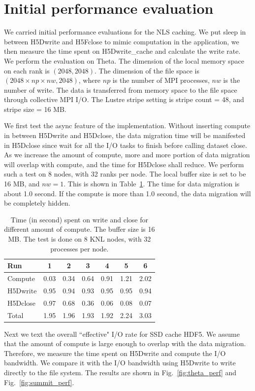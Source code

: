 \documentclass[aps, prb, 11pt, notitlepage]{revtex4-1}
\begin{document}
\section{Initial performance evaluation}
\label{sec:benchmarks}
We carried initial performance evaluations for the NLS caching. We put sleep in between H5Dwrite and H5Fclose to mimic computation in the application, we then measure the time spent on H5Dwrite\_cache and calculate the write rate. We perform the evaluation on Theta. The dimension of the local memory space on each rank is $(2048, 2048)$. The dimension of the file space is $(2048\times np\times nw, 2048)$, where $np$ is the number of MPI processes, $nw$ is the number of write. The data is transferred from memory space to the file space through collective MPI I/O. The Lustre stripe setting is stripe count = 48, and stripe size = 16 MB. 


We first test the async feature of the implementation. Without inserting compute in between H5Dwrite and H5Dclose, the data migration time will be manifested in H5Dclose since wait for all the I/O tasks to finish before calling dataset close. As we increase the amount of compute, more and more portion of data migration will overlap with compute, and the time for H5Dclose shall reduce. We perform such a test on 8 nodes, with 32 ranks per node. The local buffer size is set to be 16 MB, and $nw=1$. This is shown in Table~\ref{tab:async}. The time for data migration is about 1.0 second. If the compute is more than 1.0 second, the data migration will be completely hidden. 
\begin{table}[hbt]
\centering
\caption{Time (in second) spent on write and close for different amount of compute. The buffer size is 16 MB. The test is done on 8 KNL nodes, with 32 processes per node. }\label{tab:async}
\begin{tabular}{|l||cccccc|}
\hline
Run & 1 & 2 & 3 & 4 & 5 & 6  \\
\hline
\hline
Compute     & 0.03 &  0.34 & 0.64 & 0.91 & 1.21  & 2.02\\
H5Dwrite &  0.95 & 0.94 & 0.93 &  0.95 & 0.95  & 0.94 \\
H5Dclose & 0.97  & 0.68 & 0.36 & 0.06 & 0.08 & 0.07\\ 
\hline
\hline
Total & 1.95  & 1.96 & 1.93 & 1.92 & 2.24 & 3.03 \\
\hline
\end{tabular}
\end{table}

Next we text the overall ``effective" I/O rate for SSD cache HDF5. We assume that the amount of compute is large enough to overlap with the data migration. Therefore, we measure the time spent on H5Dwrite and compute the I/O bandwidth. We compare it with the I/O bandwidth using H5Dwrite to write directly to the file system. The results are shown in Fig.~\ref{fig:theta_perf} and Fig.~\ref{fig:summit_perf}. 
\end{document}
